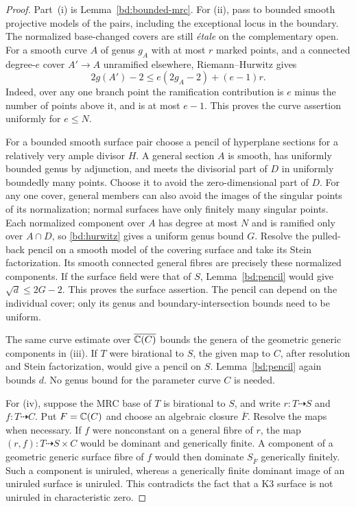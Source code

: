 \begin{proof}
Part~\textup{(i)} is Lemma~\ref{bd:bounded-mrc}.
For \textup{(ii)}, pass to bounded smooth projective models of the pairs,
including the exceptional locus in the boundary.  The normalized
base-changed covers are still \emph{\'etale} on the complementary open.
For a smooth curve $A$ of genus $g_A$ with at most $r$ marked points,
and a connected degree-$e$ cover $A'\to A$ unramified elsewhere,
Riemann--Hurwitz gives
\begin{equation}\label{bd:hurwitz}
 2g(A')-2\leq e(2g_A-2)+(e-1)r.
\end{equation}
Indeed, over any one branch point the ramification contribution is
$e$ minus the number of points above it, and is at most $e-1$.
This proves the curve assertion uniformly for $e\leq N$.

For a bounded smooth surface pair choose a pencil of hyperplane sections
for a relatively very ample divisor $H$.  A general section $A$ is smooth,
has uniformly bounded genus by adjunction, and meets the divisorial part
of $D$ in uniformly boundedly many points.  Choose it to avoid the
zero-dimensional part of $D$.  For any one cover, general members can
also avoid the images of the singular points of its normalization;
normal surfaces have only finitely many singular points.  Each
normalized component over $A$ has degree at most $N$ and is ramified
only over $A\cap D$, so \eqref{bd:hurwitz} gives a uniform genus bound
$G$.  Resolve the pulled-back pencil on a smooth model of the covering
surface and take its Stein factorization.  Its smooth connected general
fibres are precisely these normalized components.  If the surface field
were that of $S$, Lemma~\ref{bd:pencil} would give
$\sqrt d\leq2G-2$.  This proves the surface assertion.  The pencil can
depend on the individual cover; only its genus and boundary-intersection
bounds need to be uniform.

The same curve estimate over $\overline{\mathbb C(C)}$ bounds the genera of
the geometric generic components in \textup{(iii)}.  If $T$ were
birational to $S$, the given map to $C$, after resolution and Stein
factorization, would give a pencil on $S$.  Lemma~\ref{bd:pencil}
again bounds $d$.  No genus bound for the parameter curve $C$ is needed.

For \textup{(iv)}, suppose the MRC base of $T$ is birational to $S$,
and write $r:T\dashrightarrow S$ and $f:T\dashrightarrow C$.
Put $F=\mathbb C(C)$ and choose an algebraic closure $\overline F$.  Resolve
the maps when necessary.  If $f$ were nonconstant on a general fibre
of $r$, the map $(r,f):T\dashrightarrow S\times C$ would be dominant
and generically finite.  A component of a geometric generic surface
fibre of $f$ would then dominate $S_{\overline F}$ generically finitely.  Such a
component is uniruled, whereas a generically finite dominant image of
an uniruled surface is uniruled.  This contradicts the fact that a K3
surface is not uniruled in characteristic zero.


\end{proof}
